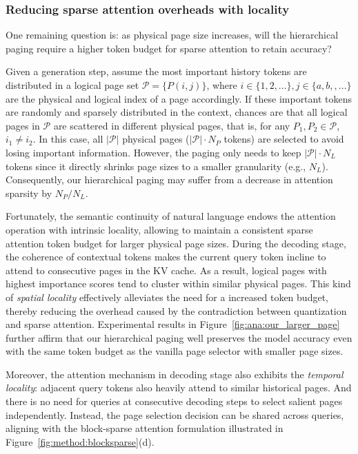 \subsubsection{Reducing sparse attention overheads with locality}
\label{sect:method:decoding:locality}


One remaining question is: as physical page size increases, will the hierarchical paging require a higher token budget for sparse attention to retain accuracy?

Given a generation step, assume the most important history tokens are distributed in a logical page set $\mathcal{P}=\{P(i,j)\}$, where $i\in\{1,2,...\}, j\in\{a,b,,...\}$ are the physical and logical index of a page accordingly. If these important tokens are randomly and sparsely distributed in the context, chances are that all logical pages in $\mathcal{P}$ are scattered in different physical pages, that is, for any $P_1, P_2 \in \mathcal{P}$, $i_1 \neq i_2$. In this case, all $|\mathcal{P}|$ physical pages ($|\mathcal{P}|\cdot N_P$ tokens) are selected to avoid losing important information. However, the \naive paging only needs to keep $|\mathcal{P}|\cdot N_L$ tokens since it directly shrinks page sizes to a smaller granularity (e.g., $N_L$). Consequently, our hierarchical paging may suffer from a decrease in attention sparsity by $N_P/N_L$.


Fortunately, the semantic continuity of natural language endows the attention operation with intrinsic locality, allowing \system to maintain a consistent sparse attention token budget for larger physical page sizes.
During the decoding stage, the coherence of contextual tokens makes the current query token incline to attend to consecutive pages in the KV cache. As a result, logical pages with highest importance scores tend to cluster within similar physical pages. This kind of \textit{spatial locality} effectively alleviates the need for a increased token budget, thereby reducing the overhead caused by the contradiction between quantization and sparse attention. Experimental results in Figure~\ref{fig:ana:our_larger_page} further affirm that our hierarchical paging well preserves the model accuracy even with the same token budget as the vanilla page selector with smaller page sizes.


Moreover, the attention mechanism in decoding stage also exhibits the \textit{temporal locality}: adjacent query tokens also heavily attend to similar historical pages. And there is no need for queries at consecutive decoding steps to select salient pages independently. Instead, the page selection decision can be shared across queries, aligning with the block-sparse attention formulation illustrated in Figure~\ref{fig:method:blocksparse}(d).

